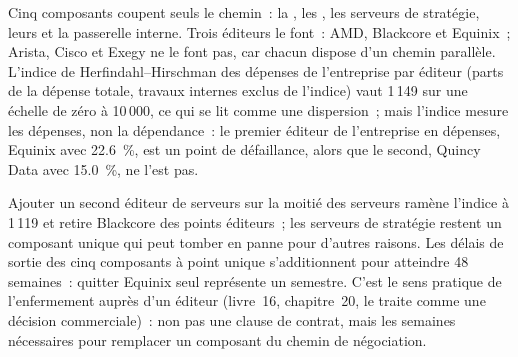 Cinq composants coupent seuls le chemin~: la , les , les serveurs de stratégie, leurs  et la passerelle interne.
Trois éditeurs le font~: AMD, Blackcore et Equinix~; Arista, Cisco et Exegy ne le font pas, car chacun dispose d'un chemin parallèle. L'indice de Herfindahl--Hirschman
des dépenses de l'entreprise par éditeur (parts de la dépense totale, travaux internes exclus de l'indice) vaut 1\,149 sur une échelle de zéro à
10\,000, ce qui se lit comme une dispersion~; mais l'indice mesure les dépenses, non la dépendance~: le
premier éditeur de l'entreprise en dépenses, Equinix avec 22.6~\%, est un point de défaillance, alors que le second, Quincy Data avec 15.0~\%, ne l'est pas.

\begin{omfigure}

\label{fig:nw:the-vendor-map:shares}
\end{omfigure}

Ajouter un second éditeur de serveurs sur la moitié des serveurs ramène l'indice à 1\,119 et retire Blackcore des points éditeurs~; les serveurs de
stratégie restent un composant unique qui peut tomber en panne pour d'autres raisons. Les délais de sortie des cinq composants à point unique s'additionnent pour atteindre 48 semaines~:
quitter Equinix seul représente un semestre. C'est le sens pratique de l'enfermement auprès d'un éditeur (livre~16, chapitre~20, le traite comme une
décision commerciale)~: non pas une clause de contrat, mais les semaines nécessaires pour remplacer un composant du chemin de négociation.

